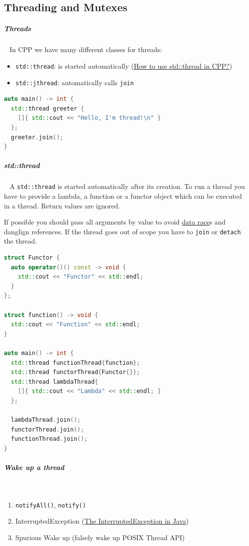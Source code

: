 \documentclass[11pt,twoside,landscape]{article}
\begin{document}
\begin{multicols}{2}
\section{Threading and Mutexes}
\label{sec:org31cd401}
\subparagraph{Threads} \
\label{sec:org42aacc6}
In CPP we have many different classes for threads:
\begin{itemize}
\item \texttt{std::thread}: is started automatically (\href{../../../roam/20230629112109-how_to_use_std_thread_in_cpp.org}{How to use std::thread in CPP?})
\item \texttt{std::jthread}: automatically calls \texttt{join}
\end{itemize}



\begin{lstlisting}[language=c++,label=lst:threads-in-cpp,caption={threads in CPP},captionpos=b,numbers=none]
auto main() -> int {
  std::thread greeter {
    []{ std::cout << "Hello, I'm thread!\n" }
  };
  greeter.join();
}
\end{lstlisting}

\subparagraph{std::thread} \
\label{sec:orge95fe9d}
A \texttt{std::thread} is started automatically after its creation.
To run a thread you have to provide a lambda, a function or a functor object which can be executed in a thread.
Return values are ignored.

If possible you should pass all arguments by value to avoid \href{../../../roam/20220323174221-what_is_a_data_race.org}{data race}s and danglign references.
If the thread goes out of scope you have to \texttt{join} or \texttt{detach} the thread.

\begin{lstlisting}[language=c++,caption={std::thread example},captionpos=b,numbers=none]
struct Functor {
  auto operator()() const -> void {
    std::cout << "Functor" << std::endl;
  }
};

struct function() -> void {
  std::cout << "Function" << std::endl;
}

auto main() -> int {
  std::thread functionThread{function};
  std::thread functorThread{Functor{}};
  std::thread lambdaThread{
    []{ std::cout << "Lambda" << std::endl; }
  };

  lambdaThread.join();
  functorThread.join();
  functionThread.join();
}
\end{lstlisting}

\subparagraph{Wake up a thread} \
\label{sec:org5226dad}
\begin{enumerate}
\item \texttt{notifyAll()}, \texttt{notify()}
\item InterruptedException (\href{../../../roam/20220228135733-the_interruptedexception_in_java.org}{The InterruptedException in Java})
\item Spurious Wake up (falsely wake up POSIX Thread API)
\end{enumerate}


\end{multicols}
\end{document}
